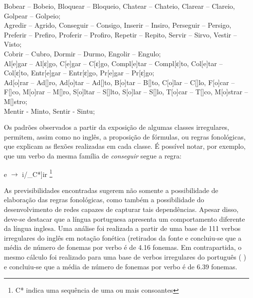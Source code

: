 \begin{center}

Bobear – Bobeio, Bloquear – Bloqueio, Chatear – Chateio, Clarear – Clareio, Golpear – Golpeio;\\

Agredir – Agrido, Conseguir – Consigo, Inserir – Insiro, Perseguir – Persigo, Preferir – Prefiro, Proferir – Profiro, Repetir – Repito, Servir –  Sirvo, Vestir – Visto;\\

Cobrir – Cubro, Dormir – Durmo, Engolir – Engulo;\\

 Al[e]gar – Al[ε]go, C[e]gar – C[ε]go, Compl[e]tar – Compl[ε]to,  Col[e]tar – Col[ε]to, Entr[e]gar – Entr[ε]go, Pr[e]gar – Pr[ε]go;\\

Ad[o]rar – Ad[\textopeno]ro, Ad[o]tar – Ad[\textopeno]to, B[o]tar – B[\textopeno]to, C[o]lar – C[\textopeno]lo, F[o]car – F[\textopeno]co, M[o]rar – M[\textopeno]ro, S[o]ltar – S[\textopeno]lto, S[o]lar – S[\textopeno]lo, T[o]car – T[\textopeno]co, M[o]strar – M[\textopeno]stro;\\

Mentir - Minto, Sentir - Sintu;

\end{center}

Os padrões observados a partir da exposição de algumas classes irregulares, permitem, assim como no inglês, a proposição de fórmulas, ou regras fonológicas, que explicam as flexões realizadas em cada classe. É possível notar, por exemplo, que um verbo da mesma família de \textit{conseguir} segue a regra:

\begin{center}
e $\rightarrow$ i/\_C*]ir \footnote{C* indica uma sequência de uma ou mais consoantes}
\end{center}


As previsibilidades encontradas sugerem não somente a possibilidade de elaboração das regras fonológicas, como também a possibilidade do desenvolvimento de redes capazes de capturar tais dependências. Apesar disso, deve-se destacar que a língua portuguesa apresenta um comportamento diferente da língua inglesa. Uma análise foi realizada a partir de uma base de 111 verbos irregulares do inglês em notação fonética (retirados da fonte %
e concluiu-se que a média de número de fonemas por verbo é de 4.16 fonemas. Em contrapartida, o mesmo cálculo foi realizado para uma base de verbos irregulares do português (%
) e concluiu-se que a média de número de fonemas por verbo é de 6.39 fonemas.

